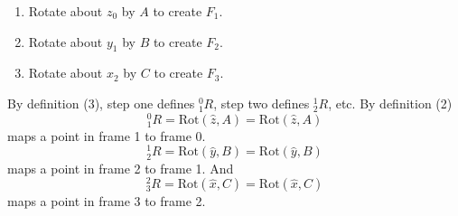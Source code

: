 \begin{enumerate}
  \item Rotate about $z_0$ by $A$ to create $F_1$.
  \item Rotate about $y_1$ by $B$ to create $F_2$.
  \item Rotate about $x_2$ by $C$ to create $F_3$.
\end{enumerate}

By definition (3), step one defines $^0_1R$, step two defines $^1_2R$, etc.  By definition (2)
\[
^0_1R = \mathrm{Rot}(\hat{z},A) =
\mathrm{Rot} \left (
\hat{z} , A \right )
\]
maps a point in frame 1 to frame 0.
\[
^1_2R = \mathrm{Rot}(\hat{y},B) =
\mathrm{Rot} \left (
\hat{y} , B \right )
\]
maps a point in frame 2 to frame 1. And
\[
^2_3R = \mathrm{Rot}(\hat{x},C) =
\mathrm{Rot} \left (
\hat{x} , C \right )
\]
maps a point in frame 3 to frame 2.

